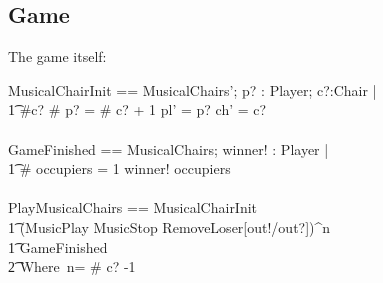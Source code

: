 \documentclass{article}
\begin{document}
\subsection*{Game}
The game itself:
\begin{zed}
MusicalChairInit == MusicalChairs'; p? : \finset Player; c?:\finset Chair | \\ \t1
\#c?  \land \# p? = \# c? + 1 \land pl' = p? \land ch' = c?  \\\\
  
  GameFinished == MusicalChairs; winner! : Player | \\ \t1
  \# occupiers = 1 \land winner! \in \ran occupiers \\\\
  
  PlayMusicalChairs == MusicalChairInit \typecolon \\ \t1
   (MusicPlay \typecolon MusicStop \typecolon RemoveLoser[out!/out?])^{n} \typecolon \\ \t1 GameFinished \\ \t2
    Where~n= \# c? -1
\end{zed}
\end{document}
